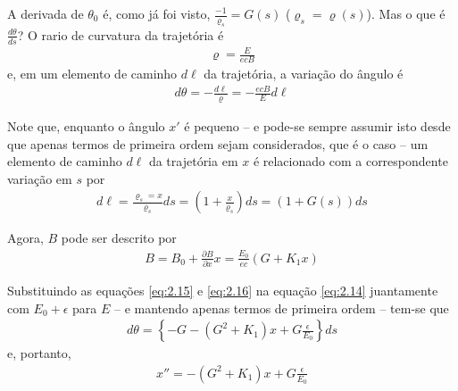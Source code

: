 A derivada de $\theta_0$ é, como já foi visto, $\frac{-1}{\varrho_s} = G(s)$ ($\varrho_s = \varrho(s)$). Mas o que é $\frac{d\theta}{ds}$? O rario de curvatura da trajetória é
\begin{align}
	\varrho = \frac{E}{ecB}
\end{align}
e, em um elemento de caminho $d\ell$ da trajetória, a variação do ângulo é
\begin{align}
	d\theta = -\frac{d\ell}{\varrho} = -\frac{ecB}{E}d\ell\label{eq:2.14}
\end{align}

Note que, enquanto o ângulo $x'$ é pequeno -- e pode-se sempre assumir isto desde que apenas termos de primeira ordem sejam considerados, que é o caso -- um elemento de caminho $d\ell$ da trajetória em $x$ é relacionado com a correspondente variação em $s$ por
\begin{align}
	d\ell = \frac{\varrho_s = x}{\varrho_s} ds = \left(1+\frac{x}{\varrho_s}\right)ds = (1+G(s))ds\label{eq:2.15}
\end{align}

Agora, $B$ pode ser descrito por
\begin{align}
	B = B_0 + \frac{\partial B}{\partial x}x = \frac{E_0}{ec}(G+K_1x)\label{eq:2.16}
\end{align}

Substituindo as equações \eqref{eq:2.15} e \eqref{eq:2.16} na equação \eqref{eq:2.14} juantamente com $E_0+\epsilon$ para $E$ -- e mantendo apenas termos de primeira ordem -- tem-se que
\begin{align}
	d\theta = \left\{-G-(G^2+K_1)x + G\frac{\epsilon}{E_0}\right\}ds
\end{align}
e, portanto, 
\begin{align}
	x'' = -(G^ 2+K_1)x + G\frac{\epsilon}{E_0}
\end{align}

